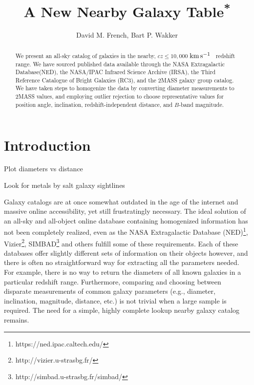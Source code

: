 \documentclass[iop]{emulateapj-rtx4}
\newcommand{\kms}{$\rm km\, s^{-1}$}
\begin{document}
\title{A New Nearby Galaxy Table\textsuperscript{*}}

\author{David M. French, Bart P. Wakker}



\begin{abstract}

We present an all-sky catalog of galaxies in the nearby, $cz \leq 10,000$ \kms~ redshift range. We have sourced published data available through the NASA Extragalactic Database(NED), the NASA/IPAC Infrared Science Archive (IRSA), the Third Reference Catalogue of Bright Galaxies (RC3), and the \cite{tully2015} 2MASS galaxy group catalog. We have taken steps to homogenize the data by converting diameter measurements to 2MASS values, and employing outlier rejection to choose representative values for position angle, inclination, redshift-independent distance, and $B$-band magnitude. 



\end{abstract}


\section{Introduction}
Plot diameters vs distance

Look for metals by salt galaxy sightlines



Galaxy catalogs are at once somewhat outdated in the age of the internet and massive online accessibility, yet still frustratingly necessary. The ideal solution of an all-sky and all-object online database containing homogenized information has not been completely realized, even as the NASA Extragalactic Database (NED)\footnote{https://ned.ipac.caltech.edu/}, Vizier\footnote{http://vizier.u-strasbg.fr/}, SIMBAD\footnote{http://simbad.u-strasbg.fr/simbad/} and others fulfill some of these requirements. Each of these databases offer slightly different sets of information on their objects however, and there is often no straightforward way for extracting all the parameters needed. For example, there is no way to return the diameters of all known galaxies in a particular redshift range. Furthermore, comparing and choosing between disparate measurements of common galaxy parameters (e.g., diameter, inclination, magnitude, distance, etc.) is not trivial when a large sample is required. The need for a simple, highly complete lookup nearby galaxy catalog remains.
\end{document}
